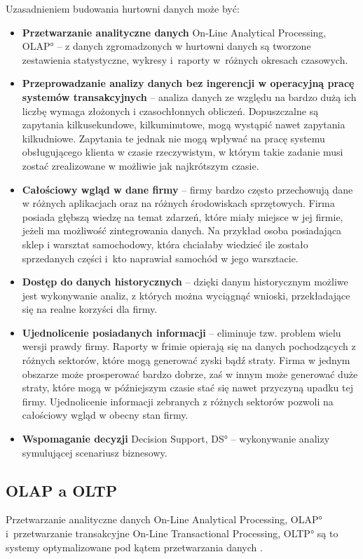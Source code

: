 Uzasadnieniem budowania hurtowni danych może być:
\begin{itemize}
 \item \textbf{Przetwarzanie analityczne danych} \ang{On-Line Analytical Processing, OLAP} --  
    z danych zgromadzonych w hurtowni danych są tworzone zestawienia statystyczne,
    wykresy i~raporty w~różnych okresach czasowych.
 \item \textbf{Przeprowadzanie analizy danych bez ingerencji w operacyjną pracę systemów transakcyjnych} --
    analiza danych ze względu na bardzo dużą ich liczbę wymaga złożonych i czasochłonnych obliczeń.
    Dopuszczalne są zapytania kilkusekundowe, kilkuminutowe, mogą wystąpić nawet zapytania kilkudniowe. 
    Zapytania te jednak nie mogą wpływać na pracę systemu obsługującego klienta w czasie rzeczywistym,
    w którym takie zadanie musi zostać zrealizowane w możliwie jak najkrótszym czasie.
\item \textbf{Całościowy wgląd w dane firmy} --
    firmy bardzo często przechowują dane w różnych aplikacjach oraz na różnych środowiskach sprzętowych.
    Firma posiada głębszą wiedzę na temat zdarzeń, które miały miejsce w jej firmie,
    jeżeli ma możliwość zintegrowania danych. Na przykład osoba posiadająca sklep i warsztat samochodowy, 
    która chciałaby wiedzieć ile zostało sprzedanych części i~kto naprawiał samochód w jego warsztacie.
\item \textbf{Dostęp do danych historycznych} -- 
    dzięki danym historycznym możliwe jest wykonywanie analiz,
    z których można wyciągnąć wnioski, przekładające się na realne korzyści dla firmy.
\item \textbf{Ujednolicenie posiadanych informacji} -- 
   eliminuje tzw. problem wielu wersji prawdy firmy. 
   Raporty w frimie opierają się na danych pochodzących z różnych sektorów, które mogą generować zyski bądź straty.
   Firma w jednym obszarze może prosperować bardzo dobrze, zaś w innym może generować duże straty, które mogą w późniejszym czasie 
   stać się nawet przyczyną upadku tej firmy. Ujednolicenie informacji zebranych z różnych sektorów pozwoli na całościowy wgląd w
   obecny stan firmy.
\item \textbf{Wspomaganie decyzji} \ang{Decision Support, DS} -- wykonywanie 
  analizy symulującej scenariusz biznesowy.
\end{itemize}


\subsection{OLAP a OLTP}
Przetwarzanie analityczne danych \ang{On-Line Analytical Processing, OLAP} 
 i~przetwarzanie transakcyjne \ang{On-Line Transactional Processing,  OLTP}
 są to systemy optymalizowane pod kątem przetwarzania danych \cite{TodMan,Vincent_Rainardi}.

